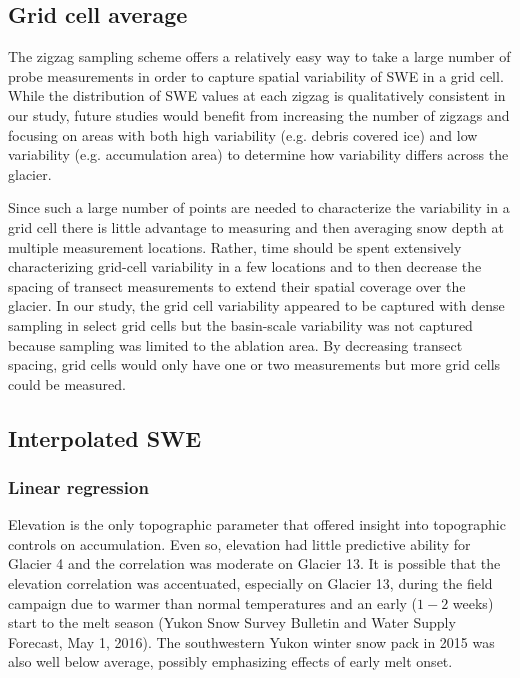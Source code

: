 \documentclass[twocolumn, letterpaper]{igs}
\begin{document}
\subsection{Grid cell average}

The zigzag sampling scheme offers a relatively easy way to take a large number of probe measurements in order to capture spatial variability of SWE in a grid cell. While the distribution of SWE values at each zigzag is qualitatively consistent in our study, future studies would benefit from increasing the number of zigzags and focusing on areas with both high variability (e.g. debris covered ice) and low variability (e.g. accumulation area) to determine how variability differs across the glacier.

Since such a large number of points are needed to characterize the variability in a grid cell there is little advantage to measuring and then averaging snow depth at multiple measurement locations. Rather, time should be spent extensively characterizing grid-cell variability in a few locations and to then decrease the spacing of transect measurements to extend their spatial coverage over the glacier. In our study, the grid cell variability appeared to be captured with dense sampling in select grid cells but the basin-scale variability was not captured because sampling was limited to the ablation area. By decreasing transect spacing, grid cells would only have one or two measurements but more grid cells could be measured. 

\subsection{Interpolated SWE}

\subsubsection{Linear regression}

Elevation is the only topographic parameter that offered insight into topographic controls on accumulation. Even so, elevation had little predictive ability for Glacier 4 and the correlation was moderate on Glacier 13. It is possible that the elevation correlation was accentuated, especially on Glacier 13, during the field campaign due to warmer than normal temperatures and an early ($1-2$ weeks) start to the melt season (Yukon Snow Survey Bulletin and Water Supply Forecast, May 1, 2016). The southwestern Yukon winter snow pack in 2015 was also well below average, possibly emphasizing effects of early melt onset.
\end{document}

